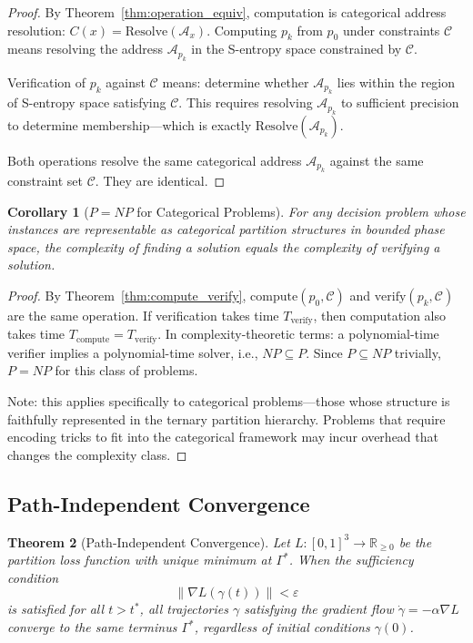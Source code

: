\documentclass[twocolumn,10pt]{article}
\newtheorem{theorem}{Theorem}[section]
\newtheorem{corollary}[theorem]{Corollary}
\theoremstyle{remark}
\newcommand{\eps}{\varepsilon}
\begin{document}
\begin{proof}
By Theorem~\ref{thm:operation_equiv}, computation is categorical address resolution: $C(x) = \mathrm{Resolve}(\mathcal{A}_x)$. Computing $p_k$ from $p_0$ under constraints $\mathcal{C}$ means resolving the address $\mathcal{A}_{p_k}$ in the S-entropy space constrained by $\mathcal{C}$.

Verification of $p_k$ against $\mathcal{C}$ means: determine whether $\mathcal{A}_{p_k}$ lies within the region of S-entropy space satisfying $\mathcal{C}$. This requires resolving $\mathcal{A}_{p_k}$ to sufficient precision to determine membership---which is exactly $\mathrm{Resolve}(\mathcal{A}_{p_k})$.

Both operations resolve the same categorical address $\mathcal{A}_{p_k}$ against the same constraint set $\mathcal{C}$. They are identical.
\end{proof}

\begin{corollary}[$P = NP$ for Categorical Problems]
\label{cor:pnp}
For any decision problem whose instances are representable as categorical partition structures in bounded phase space, the complexity of finding a solution equals the complexity of verifying a solution.
\end{corollary}

\begin{proof}
By Theorem~\ref{thm:compute_verify}, $\mathrm{compute}(p_0, \mathcal{C})$ and $\mathrm{verify}(p_k, \mathcal{C})$ are the same operation. If verification takes time $T_{\mathrm{verify}}$, then computation also takes time $T_{\mathrm{compute}} = T_{\mathrm{verify}}$. In complexity-theoretic terms: a polynomial-time verifier implies a polynomial-time solver, i.e., $NP \subseteq P$. Since $P \subseteq NP$ trivially, $P = NP$ for this class of problems.

Note: this applies specifically to categorical problems---those whose structure is faithfully represented in the ternary partition hierarchy. Problems that require encoding tricks to fit into the categorical framework may incur overhead that changes the complexity class.
\end{proof}

\subsection{Path-Independent Convergence}

\begin{theorem}[Path-Independent Convergence]
\label{thm:path_independent}
Let $L: [0,1]^3 \to \mathbb{R}_{\geq 0}$ be the partition loss function with unique minimum at $\Gamma^*$. When the sufficiency condition
\begin{equation}
\|\nabla L(\gamma(t))\| < \eps
\label{eq:sufficiency}
\end{equation}
is satisfied for all $t > t^*$, all trajectories $\gamma$ satisfying the gradient flow $\dot{\gamma} = -\alpha \nabla L$ converge to the same terminus $\Gamma^*$, regardless of initial conditions $\gamma(0)$.
\end{theorem}
\end{document}
